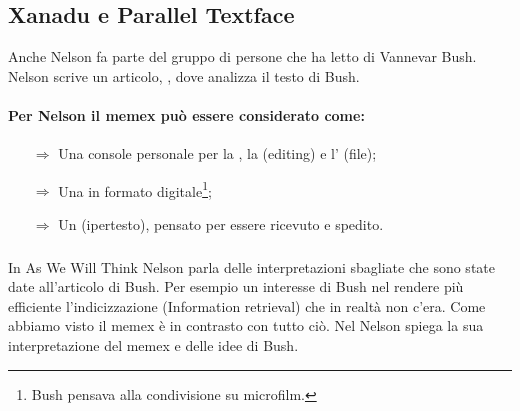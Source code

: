 \subsection{Xanadu e Parallel Textface}

Anche Nelson fa parte del gruppo di persone che ha letto  di Vannevar Bush.
Nelson scrive un articolo, , dove analizza il testo di Bush. 

\paragraph{Per Nelson il memex può essere considerato come:}

\begin{itemize}
    \item [$\Rightarrow$] Una console personale per la , la 
     (editing) e l' (file);
    \item [$\Rightarrow$] Una  in formato digitale\footnote{Bush pensava alla condivisione su microfilm.};
    \item [$\Rightarrow$] Un  (ipertesto), pensato per essere ricevuto e spedito.
\end{itemize}

\subsubsection{}

In As We Will Think Nelson parla delle interpretazioni sbagliate che sono 
state date all'articolo di Bush. Per esempio un interesse di Bush nel rendere 
più efficiente l'indicizzazione (Information retrieval) che in realtà non c'era.
Come abbiamo visto il memex è in contrasto con tutto ciò.
Nel  Nelson spiega la sua interpretazione del 
memex e delle idee di Bush.



